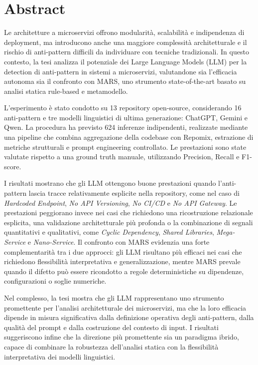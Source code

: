 \chapter{Abstract} 

Le architetture a microservizi offrono modularità, scalabilità e indipendenza di deployment, ma introducono anche una maggiore complessità architetturale e il rischio di anti-pattern difficili da individuare con tecniche tradizionali. In questo contesto, la tesi analizza il potenziale dei Large Language Models (LLM) per la detection di anti-pattern in sistemi a microservizi, valutandone sia l’efficacia autonoma sia il confronto con MARS, uno strumento state-of-the-art basato su analisi statica rule-based e metamodello.

L’esperimento è stato condotto su 13 repository open-source, considerando 16 anti-pattern e tre modelli linguistici di ultima generazione: ChatGPT, Gemini e Qwen. La procedura ha previsto 624 inferenze indipendenti, realizzate mediante una pipeline che combina aggregazione della codebase con Repomix, estrazione di metriche strutturali e prompt engineering controllato. Le prestazioni sono state valutate rispetto a una ground truth manuale, utilizzando Precision, Recall e F1-score.

I risultati mostrano che gli LLM ottengono buone prestazioni quando l’anti-pattern lascia tracce relativamente esplicite nella repository, come nel caso di \textit{Hardcoded Endpoint}, \textit{No API Versioning}, \textit{No CI/CD} e \textit{No API Gateway}. Le prestazioni peggiorano invece nei casi che richiedono una ricostruzione relazionale esplicita, una validazione architetturale più profonda o la combinazione di segnali quantitativi e qualitativi, come \textit{Cyclic Dependency}, \textit{Shared Libraries}, \textit{Mega-Service} e \textit{Nano-Service}. Il confronto con MARS evidenzia una forte complementarità tra i due approcci: gli LLM risultano più efficaci nei casi che richiedono flessibilità interpretativa e generalizzazione, mentre MARS prevale quando il difetto può essere ricondotto a regole deterministiche su dipendenze, configurazioni o soglie numeriche.

Nel complesso, la tesi mostra che gli LLM rappresentano uno strumento promettente per l’analisi architetturale dei microservizi, ma che la loro efficacia dipende in misura significativa dalla definizione operativa degli anti-pattern, dalla qualità del prompt e dalla costruzione del contesto di input. I risultati suggeriscono infine che la direzione più promettente sia un paradigma ibrido, capace di combinare la robustezza dell’analisi statica con la flessibilità interpretativa dei modelli linguistici.




